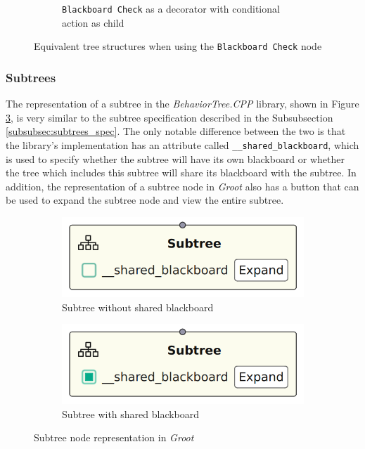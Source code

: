 \begin{figure}[!h]
\begin{subfigure}[b]{.49\linewidth}
        \caption{\texttt{Blackboard Check} as a decorator with conditional action as child}
        \label{fig:blackboard_check_eq_action_as_child}
    \end{subfigure}
    \caption{Equivalent tree structures when using the \texttt{Blackboard Check} node}
    \label{fig:blackboard_check_equivalences}
\end{figure}

\subsubsection{Subtrees}

The representation of a subtree in the \textit{BehaviorTree.CPP} library, shown in Figure \ref{fig:subtrees_impl}, is very similar to the subtree specification described in the Subsubsection \ref{subsubsec:subtrees_spec}. The only notable difference between the two is that the library's implementation has an attribute called \texttt{\_\_shared\_blackboard}, which is used to specify whether the subtree will have its own blackboard or whether the tree which includes this subtree will share its blackboard with the subtree. In addition, the representation of a subtree node in \textit{Groot} also has a button that can be used to expand the subtree node and view the entire subtree.

\begin{figure}[!h]
    \centering
    \begin{subfigure}[b]{.49\linewidth}
        \centering
        \includegraphics[width=0.6\linewidth]{chapters/development/images/SubtreeNode - Not Shared BB.png}
        \caption{Subtree without shared blackboard}
    \end{subfigure}
    \hfill
    \begin{subfigure}[b]{.49\linewidth}
        \centering
        \includegraphics[width=0.6\linewidth]{chapters/development/images/SubtreeNode - Shared BB.png}
        \caption{Subtree with shared blackboard}
    \end{subfigure}
    \caption{Subtree node representation in \textit{Groot}}
    \label{fig:subtrees_impl}
\end{figure}

